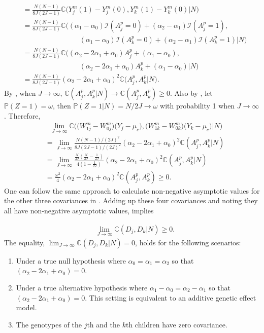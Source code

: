 \documentclass[12pt]{extarticle}
\newcommand{\pp}{\mathbb{P}}
\newcommand{\nind}{J}
\newcommand{\indicator}{\mathcal{I}}
\newcommand{\cV}{\mathbb{C}}
\begin{document}
{{\begin{align*}
&= \frac{N(N-1)}{8\nind (2\nind-1)} \cV\Big(Y^m_j(1)-Y^m_j(0),Y^m_k(1)-Y^m_k(0)\Big|N\Big) \\
&= \frac{N(N-1)}{8\nind (2\nind-1)}\cV \Big((\alpha_1-\alpha_0)\indicator(A^p_j=0)+(\alpha_2-\alpha_1)\indicator(A^p_j=1), ~ \\
& \qquad \qquad \qquad \qquad (\alpha_1-\alpha_0)\indicator(A^p_k=0)+(\alpha_2-\alpha_1)\indicator(A^p_k=1)\Big|N \Big) \\
&=\frac{N(N-1)}{8\nind (2\nind-1)} \cV \Big((\alpha_2-2\alpha_1+\alpha_0)A_j^p+(\alpha_1-\alpha_0), ~ \\
& \qquad \qquad \qquad \qquad  (\alpha_2-2\alpha_1+\alpha_0)A_k^p+(\alpha_1-\alpha_0)\Big|N \Big) \\
&= \frac{N(N-1)}{8\nind(2\nind-1)}(\alpha_2-2\alpha_1+\alpha_0)^2 \cV\big(A^p_j,A^p_k\big|N\big).
\end{align*}}By , when $\nind \to \infty$, $\cV(A^p_j,A^p_k|N)\to \cV(A^p_j,A^p_k)\geq 0$. Also by , let $\pp(Z=1)=\omega$, then $\pp(Z=1|N)=N/2\nind \rightarrow \omega$ with probability 1 when $\nind \rightarrow \infty$. Therefore, 
{\allowdisplaybreaks \begin{align*}
&~~~ \lim_{\nind \to \infty}\cV\Big(\big(W_{1j}^m-W_{0j}^m\big)\big(Y_j-\mu_c\big),\big(W_{1k}^m-W_{0k}^m\big)\big(Y_k-\mu_c\big)\Big|N\Big) \nonumber \\
&= \lim_{\nind \to \infty} \frac{N(N-1)/(2\nind)^2}{8\nind(2\nind-1)/(2\nind)^2}(\alpha_2-2\alpha_1+\alpha_0)^2 \cV(A^p_j,A^p_k|N)\nonumber \\
&= \lim_{\nind\to \infty}\frac{\frac{N}{2\nind}(\frac{N}{2\nind}-\frac{1}{2\nind})}{4(1-\frac{1}{2\nind})}(\alpha_2-2\alpha_1+\alpha_0)^2 \cV(A^p_j,A^p_k|N) \nonumber \\
&= \frac{\omega^2}{4} (\alpha_2-2\alpha_1+\alpha_0)^2 \cV(A^p_j,A^p_k) \geq 0.
\end{align*}}One can follow the same approach to calculate non-negative asymptotic values for the other three covariances in . Adding up these four covariances and noting they all have non-negative asymptotic values, implies 
{\allowdisplaybreaks \begin{align*}
& \lim_{\nind \to \infty} \cV(D_j,D_k|N) \geq 0.
\end{align*} The equality, $\lim_{\nind \to \infty}\cV(D_j,D_k|N)=0$, holds for the following scenarios: \begin{enumerate}
\item[(A)] Under a true null hypothesis where $\alpha_0=\alpha_1=\alpha_2$ so that $(\alpha_2-2\alpha_1+\alpha_0)=0$.
\item[(B)] Under a true alternative hypothesis where $\alpha_1-\alpha_0=\alpha_2-\alpha_1$ so that $(\alpha_2-2\alpha_1+\alpha_0)=0$. This setting is equivalent to an additive genetic effect model. 
\item[(C)] The genotypes of the $j$th and the $k$th children have zero covariance. 
\end{enumerate}

}}
\end{document}

